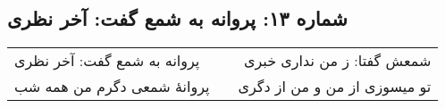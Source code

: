 \begin{center}
\section*{شماره ۱۳: پروانه به شمع گفت: آخر نظری}
\label{sec:013}
\begin{longtable}{l p{0.5cm} r}
پروانه به شمع گفت: آخر نظری
&&
شمعش گفتا: ز من نداری خبری
\\
پروانهٔ شمعی دگرم من همه شب
&&
تو میسوزی از من و من از دگری
\\
\end{longtable}
\end{center}
